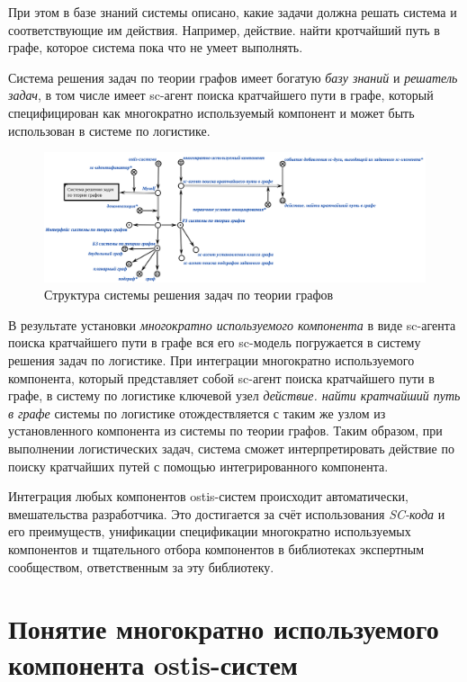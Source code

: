 При этом в базе знаний системы описано, какие задачи должна решать система и соответствующие им действия. Например, действие. найти кротчайший путь в графе, которое система пока что не умеет выполнять.

Система решения задач по теории графов имеет богатую \textit{базу знаний} и \textit{решатель задач}, в том числе имеет sc-агент поиска кратчайшего пути в графе, который специфицирован как многократно используемый компонент и может быть использован в системе по логистике.

\begin{figure}[H]
	\includegraphics[scale=0.4]{author/part5/figures/graph_theory_system.png}
	\caption{Структура системы решения задач по теории графов}
	\label{fig:graph_theory_system}
\end{figure}

В результате установки \textit{многократно используемого компонента} в виде sc-агента поиска кратчайшего пути в графе вся его sc-модель погружается в систему решения задач по логистике. При интеграции многократно используемого компонента, который представляет собой sc-агент поиска кратчайшего пути в графе, в систему по логистике ключевой узел \textit{действие. найти кратчайший путь в графе} системы по логистике отождествляется с таким же узлом из установленного компонента из системы по теории графов. Таким образом, при выполнении логистических задач, система сможет интерпретировать действие по поиску кратчайших путей с помощью интегрированного компонента.

Интеграция любых компонентов ostis-систем происходит автоматически,  вмешательства разработчика. Это достигается за счёт использования \textit{SC-кода} и его преимуществ, унификации спецификации многократно используемых компонентов и тщательного отбора компонентов в библиотеках экспертным сообществом, ответственным за эту библиотеку.

\section{Понятие многократно используемого компонента ostis-систем}
\label{reusable_component_section}

